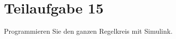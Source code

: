 \section{Teilaufgabe 15}
\begin{aufgabe}
    Programmieren Sie den ganzen Regelkreis mit Simulink.
\end{aufgabe}
